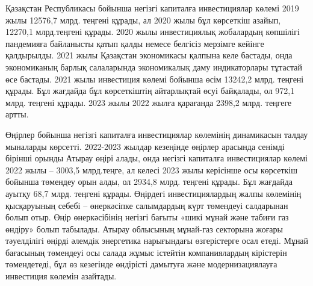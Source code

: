 \begin{multicols}{2}
Қазақстан Республикасы бойынша негізгі капиталға инвестициялар көлемі
2019 жылы 12576,7 млрд. теңгені құрады, ал 2020 жылы бұл көрсеткіш
азайып, 12270,1 млрд.теңгені құрады. 2020 жылы инвестициялық жобалардың
көпшілігі пандемияға байланысты қатып қалды немесе белгісіз мерзімге
кейінге қалдырылды. 2021 жылы Қазақстан экономикасы қалпына келе
бастады, онда экономиканың барлық салаларында экономикалық даму
индикаторлары тұтастай өсе бастады. 2021 жылы инвестиция көлемі бойынша
өсім 13242,2 млрд. теңгені құрады. Бұл жағдайда бұл көрсеткіштің
айтарлықтай өсуі байқалады, ол 972,1 млрд. теңгені құрады. 2023 жылы
2022 жылға қарағанда 2398,2 млрд. теңгеге артты.

Өңірлер бойынша негізгі капиталға инвестициялар көлемінің динамикасын
талдау мыналарды көрсетті. 2022-2023 жылдар кезеңінде өңірлер арасында
сенімді бірінші орынды Атырау өңірі алады, онда негізгі капиталға
инвестициялар көлемі 2022 жылы -- 3003,5 млрд.теңге, ал келесі 2023 жылы
керісінше осы көрсеткіш бойынша төмендеу орын алды, ол 2934,8 млрд.
теңгені құрады. Бұл жағдайда ауытқу 68,7 млрд. теңгені құрады. Өңірдегі
инвестициялардың жалпы көлемінің қысқаруының себебі -- өнеркәсіпке
салымдардың күрт төмендеуі салдарынан болып отыр. Өңір өнеркәсібінің
негізгі бағыты «шикі мұнай және табиғи газ өндіру» болып табылады.
Атырау облысының мұнай-газ секторына жоғары тәуелділігі өңірді әлемдік
энергетика нарығындағы өзгерістерге осал етеді. Мұнай бағасының
төмендеуі осы салада жұмыс істейтін компаниялардың кірістерін
төмендетеді, бұл өз кезегінде өндірісті дамытуға және модернизациялауға
инвестиция көлемін азайтады.
\end{multicols}

